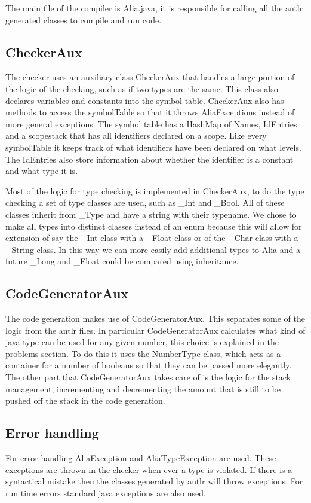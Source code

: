 \documentclass[paper=a4, fontsize=11pt]{article}
\numberwithin{equation}{section}		%
\numberwithin{figure}{section}			%
\numberwithin{table}{section}				%
\begin{document}
The main file of the compiler is Alia.java, it is responsible for calling all the antlr generated classes to compile and run code.

\subsection{CheckerAux}
The checker uses an auxiliary class CheckerAux that handles a large portion of the logic of the checking, such as if two types are the same. This class also declares variables and constants into the symbol table. CheckerAux also has methods to access the symbolTable so that it throws AliaExceptions instead of more general exceptions. The symbol table has a HashMap of Names, IdEntries and a scopestack that has all identifiers declared on a scope. Like every symbolTable it keeps track of what identifiers have been declared on what levels. The IdEntries also store information about whether the identifier is a constant and what type it is.

Most of the logic for type checking is implemented in CheckerAux, to do the type checking a set of type classes are used, such as \_Int and \_Bool. All of these classes inherit from \_Type and have a string with their typename. We chose to make all types into distinct classes instead of an enum because this will allow for extension of say the \_Int class with a \_Float class or of the \_Char class with a \_String class. In this way we can more easily add additional types to Alia and a future \_Long and \_Float could be compared using inheritance.

\subsection{CodeGeneratorAux}
The code generation makes use of CodeGeneratorAux. This separates some of the logic from the antlr files. In particular CodeGeneratorAux calculates what kind of java type can be used for any given number, this choice is explained in the problems section. To do this it uses the NumberType class, which acts as a container for a number of booleans so that they can be passed more elegantly. The other part that CodeGeneratorAux takes care of is the logic for the stack management, incrementing and decrementing the amount that is still to be pushed off the stack in the code generation.

\subsection{Error handling}
For error handling AliaException and AliaTypeException are used. These exceptions are thrown in the checker when ever a type is violated. If there is a syntactical mistake then the classes generated by antlr will throw exceptions. For run time errors standard java exceptions are also used.
\end{document}

